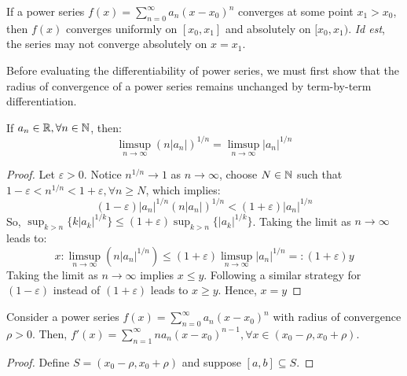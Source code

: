 \begin{remark}
    If a power series $f(x) = \sum_{n=0}^\infty a_n (x - x_0)^n$ converges at some point $x_1 > x_0$, then $f(x)$ converges uniformly on $[x_0, x_1]$ and absolutely on $[x_0, x_1)$. \emph{Id est}, the series may not converge absolutely on $x = x_1$.
\end{remark}

Before evaluating the differentiability of power series, we must first show that the radius of convergence of a power series remains unchanged by term-by-term differentiation.

\begin{lemma}
    If $a_n \in \mathbb{R}, \forall n \in \mathbb{N}$, then:
    \begin{equation*}
        \limsup\limits_{n\to \infty} (n|a_n|)^{1/n} = \limsup \limits_{n \to \infty}|a_n|^{1/n}
    \end{equation*}
\end{lemma}

\begin{proof}
    Let $\varepsilon > 0$. Notice $n^{1/n} \to 1$ as $n \to \infty$, choose $N \in \mathbb{N}$ such that $1 - \varepsilon < n^{1/n} < 1 + \varepsilon, \forall n \geq N$, which implies:
    \begin{equation*}
        (1 - \varepsilon)|a_n|^{1/n} (n|a_n|)^{1/n} < (1 + \varepsilon)|a_n|^{1/n}
    \end{equation*}
    So, $\sup_{k > n}\{ k |a_k|^{1/k}\} \leq (1 + \varepsilon)\sup_{k > n} \{|a_k|^{1/k}\}$. Taking the limit as $n \to \infty$ leads to:
    \begin{equation*}
        x: \limsup \limits_{n \to \infty} (n |a_n|^{1/n}) \leq (1+\varepsilon)\limsup \limits_{n \to \infty} |a_n|^{1/n} =: (1+\varepsilon)y
    \end{equation*}
    Taking the limit as $n \to \infty$ implies $x \leq y$. Following a similar strategy for $(1-\varepsilon)$ instead of $(1+\varepsilon)$ leads to $x \geq y$. Hence, $x = y$
\end{proof}

\begin{theorem}
    Consider a power series $f(x) = \sum_{n=0}^\infty a_n(x - x_0)^n$ with radius of convergence $\rho >0$. Then, $f'(x) = \sum_{n=1}^\infty n a_n (x - x_0)^{n-1}, \forall x \in (x_0 - \rho, x_0 + \rho)$.
\end{theorem}

\begin{proof}
    Define $S = (x_0 - \rho, x_0 + \rho)$ and suppose $[a,b] \subseteq S$. 
\end{proof}

